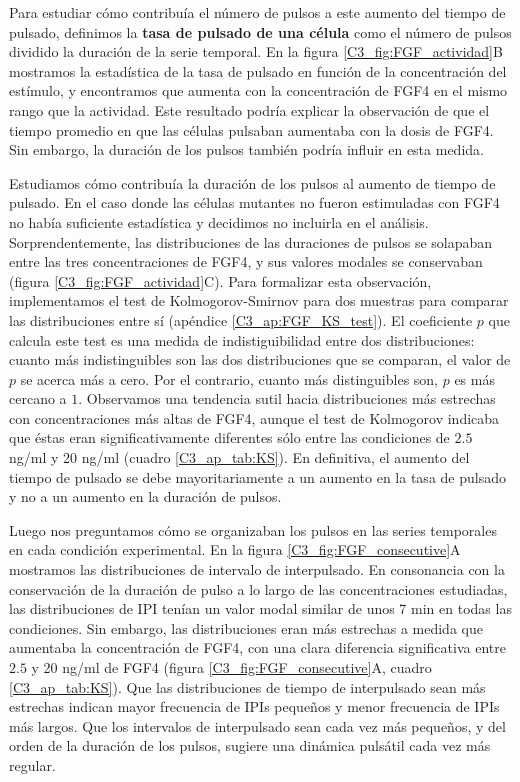 \documentclass[./main.tex]{subfiles}
\begin{document}
Para estudiar cómo contribuía el número de pulsos a este aumento del tiempo de pulsado, definimos la \textbf{tasa de pulsado de una célula} como el número de pulsos dividido la duración de la serie temporal. En la figura  \ref{C3_fig:FGF_actividad}B mostramos la estadística de la tasa de pulsado en función de la concentración del estímulo, y encontramos que aumenta con la concentración de FGF4 en el mismo rango que la actividad. Este resultado podría explicar la observación de que el tiempo promedio en que las células pulsaban aumentaba con la dosis de FGF4. Sin embargo, la duración de los pulsos también podría influir en esta medida. 


Estudiamos cómo contribuía la duración de los pulsos al aumento de tiempo de pulsado. En el caso donde las células mutantes no fueron estimuladas con FGF4 no había suficiente estadística y decidimos no incluirla en el análisis. Sorprendentemente, las distribuciones de las duraciones de pulsos se solapaban entre las tres concentraciones de FGF4, y sus valores modales se conservaban (figura \ref{C3_fig:FGF_actividad}C). Para formalizar esta observación, implementamos el test de Kolmogorov-Smirnov para dos muestras para comparar las distribuciones entre sí \cite{Frodesen1979} (apéndice \ref{C3_ap:FGF_KS_test}). El coeficiente $p$ que calcula este test es una medida de indistiguibilidad entre dos distribuciones: cuanto más indistinguibles son las dos distribuciones que se comparan, el valor de $p$ se acerca más a cero. Por el contrario, cuanto más distinguibles son, $p$  es más cercano a $1$. Observamos una tendencia sutil hacia distribuciones más estrechas con concentraciones más altas de FGF4, aunque el test de Kolmogorov indicaba que éstas eran significativamente diferentes sólo entre las condiciones de $2.5$ ng/ml y 20 ng/ml (cuadro \ref{C3_ap_tab:KS}). En definitiva, el aumento del tiempo de pulsado se debe mayoritariamente a un aumento en la tasa de pulsado y no a un aumento en la duración de pulsos. 


Luego nos preguntamos cómo se organizaban los pulsos en las series temporales en cada condición experimental. En la figura \ref{C3_fig:FGF_consecutive}A mostramos las distribuciones de intervalo de interpulsado. En consonancia con la conservación de la duración de pulso a lo largo de las concentraciones estudiadas, las distribuciones de IPI tenían un valor modal similar de unos 7 min en todas las condiciones. Sin embargo, las distribuciones eran más estrechas a medida que aumentaba la concentración de FGF4, con una clara diferencia significativa entre $2.5$ y 20 ng/ml de FGF4 (figura \ref{C3_fig:FGF_consecutive}A, cuadro \ref{C3_ap_tab:KS}). Que las distribuciones de tiempo de interpulsado sean más estrechas indican mayor frecuencia de IPIs pequeños y menor frecuencia de IPIs más largos. Que los intervalos de interpulsado sean cada vez más pequeños, y del orden de la duración de los pulsos, sugiere una dinámica pulsátil cada vez más regular.  
\end{document}
